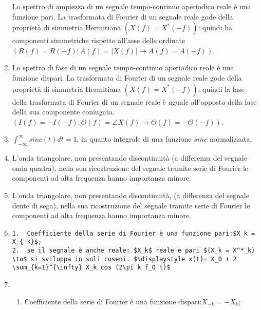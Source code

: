 \documentclass[
  paper=a4,
  ,captions=tableheading
]{scrartcl}
\providecommand{\tightlist}{%
  \setlength{\itemsep}{0pt}\setlength{\parskip}{0pt}}
\begin{document}
\begin{enumerate}
  Lo spettro di ampiezza di un segnale tempo-continuo aperiodico reale è
  una funzione pari. La trasformata di Fourier di un segnale reale gode
  della proprietà di simmetria Hermitiana \((X(f) = X^*(-f))\): quindi
  ha componenti simmetriche rispetto all'asse delle ordinate
  \((R(f)=R(-f); A(f)=|X(f)| \to A(f)=A(-f))\).
\item
  Lo spettro di fase di un segnale tempo-continuo aperiodico reale è una
  funzione dispari. La trasformata di Fourier di un segnale reale gode
  della proprietà di simmetria Hermitiana \((X(f) = X^*(-f))\): quindi
  la fase della trasformata di Fourier di un segnale reale è uguale
  all'opposto della fase della sua componente coniugata.
  \((I(f)=-I(-f); \Theta(f)=\angle X(f) \to \Theta(f)=-\Theta(-f))\).
\item
  \(\displaystyle \int_{-\infty}^\infty sinc(t)dt = 1\), in quanto
  integrale di una funzione \(sinc\) normalizzata.
\item
  L'onda triangolare, non presentando discontinuità (a differenza del
  segnale onda quadra), nella sua ricostruzione del segnale tramite
  serie di Fourier le componenti ad alta frequenza hanno importanza
  minore.
\item
  L'onda triangolare, non presentando discontinuità, (a differenza del
  segnale dente di sega), nella sua ricostruzione del segnale tramite
  serie di Fourier le componenti ad alta frequenza hanno importanza
  minore.
\item
\begin{verbatim}
1.  Coefficiente della serie di Fourier è una funzione pari:$X_k = X_{-k}$;
2.  se il segnale è anche reale: $X_k$ reale e pari $(X_k = X^*_k) \to$ si sviluppa in soli coseni. $\displaystyle x(t)= X_0 + 2 \sum_{k=1}^{\infty} X_k cos (2\pi k f_0 t)$
\end{verbatim}
\item
  \begin{enumerate}
  \def\labelenumii{\arabic{enumii}.}
  \tightlist
  \item
    Coefficiente della serie di Fourier è una funzione
    dispari:\(X_{-k} = -X_{k}\);


\end{enumerate}
\end{enumerate}
\end{document}
